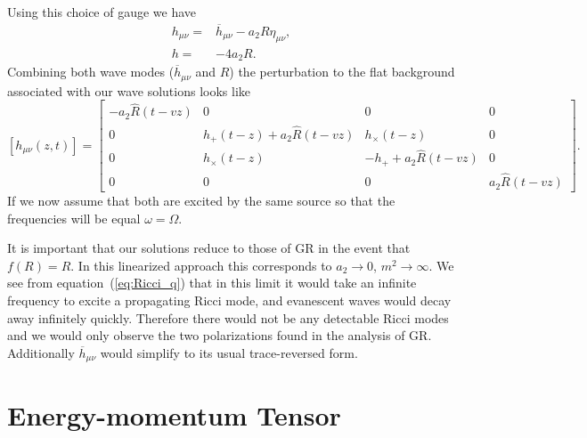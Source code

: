 \documentclass[a4paper, 11pt, titlepage, twoside]{report}
\newcommand{\eqnref}[1]{equation~(\ref{eq:#1})}
\begin{document}
{Using this choice of gauge we have
\begin{align}
h_{\mu\nu} = {} & \overline{h}_{\mu\nu} - a_2 R\eta_{\mu\nu},\\
h = {} & -4a_2R.
\label{eq:gauge}
\end{align}
Combining both wave modes ($\overline{h}_{\mu\nu}$ and $R$) the perturbation to the flat background associated with our wave solutions looks like
\begin{equation}
\left[{h}_{\mu\nu}(z,t)\right] =
\begin{bmatrix}
-a_2\widehat{R}(t - vz) & 0 & 0 & 0\\
0 & h_+(t - z) + a_2\widehat{R}(t - vz) & h_\times(t - z) & 0\\
0 & h_\times(t - z) & -h_+ + a_2\widehat{R}(t - vz) & 0\\
0 & 0 & 0 & a_2\widehat{R}(t - vz)
\end{bmatrix}.
\end{equation}
If we now assume that both are excited by the same source so that the frequencies will be equal $\omega = \Omega$.

It is important that our solutions reduce to those of GR in the event that $f(R) = R$. In this linearized approach this corresponds to $a_2 \rightarrow 0$, $m^2 \rightarrow \infty$. We see from \eqnref{Ricci_q} that in this limit it would take an infinite frequency to excite a propagating Ricci mode, and evanescent waves would decay away infinitely quickly. Therefore there would not be any detectable Ricci modes and we would only observe the two polarizations found in the analysis of GR. Additionally $\overline{h}_{\mu\nu}$ would simplify to its usual trace-reversed form.

\section{Energy-momentum Tensor}

}
\end{document}
